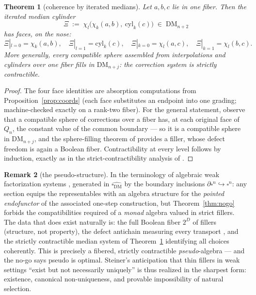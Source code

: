 \documentclass[11pt]{amsart}
\newtheorem{thm}{Theorem}[section]
\theoremstyle{definition}
\newtheorem{rem}[thm]{Remark}
\newcommand{\DM}{\mathrm{DM}}
\newcommand{\cube}{\square_{\mathrm{DM}}}
\newcommand{\lc}{Q}
\newcommand{\bnd}{\partial}
\newcommand{\cyl}{\mathrm{cyl}}
\begin{document}
\begin{thm}[coherence by iterated medians]
  \label{thm:coherence}
  Let $a, b, c$ lie in one fiber.  Then the iterated median
  cylinder
  \[
    \Xi \;:=\; \chi_{l}\bigl(\chi_{k}(a, b),\ \cyl_{k}(c)\bigr)
    \;\in\; \DM_{n+2}
  \]
  has faces, on the nose:
  \[
    \Xi|_{l=0} = \chi_{k}(a,b), \quad
    \Xi|_{l=1} = \cyl_{k}(c), \quad
    \Xi|_{k=0} = \chi_{l}(a,c), \quad
    \Xi|_{k=1} = \chi_{l}(b,c).
  \]
  More generally, every compatible sphere assembled from
  interpolations and cylinders over one fiber fills in
  $\DM_{n+j}$: the correction system is strictly contractible.
\end{thm}

\begin{proof}
  The four face identities are absorption computations from
  Proposition~\ref{prop:coords} (each face substitutes an endpoint
  into one grading; machine-checked exactly on a rank-two fiber).
  For the general statement, observe that a compatible sphere of
  corrections over a fiber has, at each original face of $\lc_n$,
  the constant value of the common boundary --- so it is a
  compatible sphere in $\DM_{n+j}$, and the sphere-filling theorem
  of \cite[Thm.~4.1]{DMFibers} provides a filler, whose defect
  freedom is again a Boolean fiber.  Contractibility at every level
  follows by induction, exactly as in the strict-contractibility
  analysis of \cite{Convexity}.
\end{proof}

\begin{rem}[the pseudo-structure]
  In the terminology of algebraic weak factorization systems
  \cite{Garner}, generated in $\widehat{\cube}$ by the boundary
  inclusions $\bnd\square^n \hookrightarrow \square^n$: any section
  equips the representables with an algebra structure for the
  \emph{pointed endofunctor} of the associated one-step
  construction, but Theorem~\ref{thm:nogo} forbids the
  compatibilities required of a \emph{monad} algebra valued in
  strict fillers.  The data that does exist naturally is: the full
  Boolean fiber $2^{D}$ of fillers (structure, not property), the
  defect antichain measuring every transport
  \cite{StrictDM}, and the strictly contractible median system of
  Theorem~\ref{thm:coherence} identifying all choices coherently.
  This is precisely a fibered, strictly contractible
  \emph{pseudo}-algebra --- and the no-go says pseudo is optimal.
  Steiner's anticipation that thin fillers in weak settings
  ``exist but not necessarily uniquely'' \cite{Steiner} is thus
  realized in the sharpest form: existence, canonical
  non-uniqueness, and provable impossibility of natural selection.
\end{rem}
\end{document}
